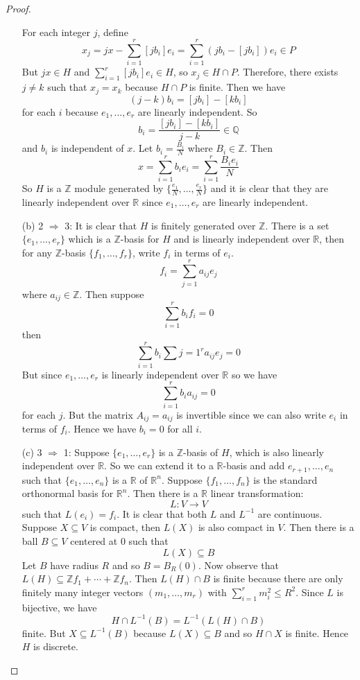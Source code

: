 \begin{proof}
\begin{enumerate}
For each integer $j$, define
$$x_j=jx-\sum_{i=1}^r [jb_i]e_i=\sum_{i=1}^r \left(jb_i-[jb_i]\right)e_i\in P$$
But $jx \in H$ and $\sum_{i=1}^r[jb_i]e_i \in H$, so $x_j \in H \cap P$.
Therefore, there exists $j \neq k$ such that $x_j=x_k$ because $H \cap P$ is finite.
Then we have
$$(j-k)b_i=[jb_i]-[kb_i]$$
for each $i$ because $e_1,\ldots,e_r$ are linearly independent.
So
$$b_i=\frac{[jb_i]-[kb_i]}{j-k} \in \mathbb{Q}$$
and $b_i$ is independent of $x$. Let $b_i=\frac{B_i}{N}$ where $B_i \in \mathbb{Z}$.
Then
$$x=\sum_{i=1}^r b_ie_i=\sum_{i=1}^r\frac{B_ie_i}{N}$$
So $H$ is a $\mathbb{Z}$ module generated by $\{\frac{e_1}{N},\ldots,\frac{e_r}{N}\}$ and it is clear that
they are linearly independent over $\mathbb{R}$ since $e_1,\ldots,e_r$ are linearly independent.
\item[(b)] 2 $\Rightarrow$ 3: It is clear that $H$ is finitely generated over $\mathbb{Z}$. There is a set
$\{e_1,\ldots,e_r\}$ which is a $\mathbb{Z}$-basis for $H$ and is linearly independent over $\mathbb{R}$, then for any $\mathbb{Z}$-basis $\{f_1,\ldots,f_r\}$, write $f_i$ in terms of $e_i$.
$$f_i=\sum_{j=1}^r a_{ij}e_j$$
where $a_{ij} \in \mathbb{Z}$. Then suppose
$$\sum_{i=1}^r b_if_i=0$$
then
$$\sum_{i=1}^r b_i\sum{j=1}^r a_{ij}e_j=0$$
But since $e_1,\ldots,e_r$ is linearly independent over $\mathbb{R}$ so we have
$$\sum_{i=1}^r b_i a_{ij}=0$$ for each $j$.
But the matrix $A_{ij}=a_{ij}$ is invertible since we can also write $e_i$ in terms of $f_i$. Hence
we have $b_i=0$ for all $i$.
\item[(c)] 3 $\Rightarrow$ 1: Suppose $\{e_1,\ldots,e_r\}$ is a $\mathbb{Z}$-basis of $H$, which is also linearly independent over $\mathbb{R}$. So we can extend it to a $\mathbb{R}$-basis and add $e_{r+1},\ldots,e_n$ such that $\{e_1,\ldots,e_n\}$ is a $\mathbb{R}$ of $\mathbb{R}^n$. Suppose $\{f_1,\ldots,f_n\}$ is the standard orthonormal basis for $\mathbb{R}^n$. Then there is a $\mathbb{R}$ linear transformation:
$$L: V \rightarrow V$$
such that $L(e_i)=f_i$. It is clear that both $L$ and $L^{-1}$ are continuous. Suppose $X \subseteq V$ is compact, then $L(X)$ is also compact in $V$. Then there is a ball $B \subseteq V$ centered at $0$ such that
$$L(X) \subseteq B$$ Let $B$ have radius $R$ and so $B=B_R(0)$.
Now observe that $L(H) \subseteq \mathbb{Z}f_1+\cdots+\mathbb{Z}f_n$. Then
$L(H) \cap B$ is finite because there are only finitely many integer vectors
$(m_1,\ldots,m_r)$ with $\sum_{i=1}^r m^2_i \le R^2$.
Since $L$ is bijective, we have
$$H \cap L^{-1}(B)=L^{-1}(L(H) \cap B)$$
finite. But $X \subseteq L^{-1}(B)$ because $L(X) \subseteq B$ and so $H \cap X$ is finite. Hence $H$ is discrete.
\end{enumerate}
\end{proof}
